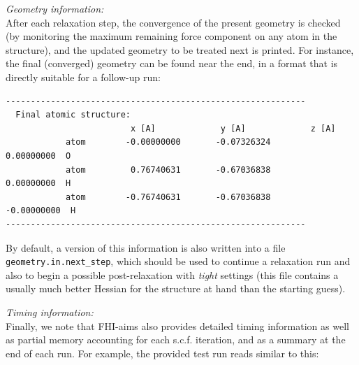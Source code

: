 \emph{Geometry information:} \\
After each relaxation step, the convergence of the present geometry is checked
(by monitoring the maximum remaining force component on any atom in the
structure), and the updated geometry to be treated next is printed. For
instance, the final (converged) geometry can be found near the end, in a
format that is directly suitable for a follow-up run:

{\small
\begin{verbatim}
------------------------------------------------------------
  Final atomic structure:
                         x [A]             y [A]             z [A]
            atom        -0.00000000       -0.07326324        0.00000000  O
            atom         0.76740631       -0.67036838        0.00000000  H
            atom        -0.76740631       -0.67036838       -0.00000000  H
------------------------------------------------------------
\end{verbatim}
}

By default, a version of this information is also written into a file 
\texttt{geometry.in.next\_step},
which should be used to continue a relaxation run and also to begin
a possible post-relaxation with \textit{tight} settings (this file
contains a usually much better Hessian for the structure at hand than
the starting guess).

\emph{Timing information:} \\
Finally, we note that FHI-aims also provides detailed timing
information as well as partial memory accounting for each
s.c.f. iteration, and as a summary at the end of each run. For
example, the provided test run reads similar to this: 

